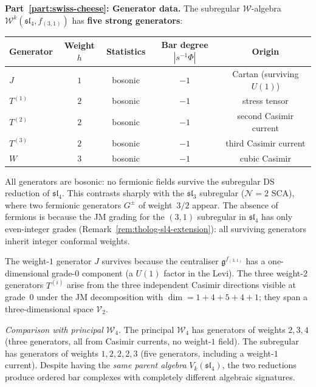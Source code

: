 \begin{computation}
\label{comp:ordered-bar-sl4-subreg}

\medskip
\noindent\textbf{Part~\ref{part:swiss-cheese}: Generator data.}
The subregular $\mathcal W$-algebra
$\mathcal W^k(\mathfrak{sl}_4,f_{(3,1)})$ has \textbf{five
strong generators}:
\begin{center}
\renewcommand{\arraystretch}{1.15}
\begin{tabular}{lcccc}
\textbf{Generator} & \textbf{Weight $h$} &
 \textbf{Statistics} & \textbf{Bar degree $|s^{-1}\Phi|$} &
 \textbf{Origin} \\
\hline
$J$ & $1$ & bosonic & $-1$ &
 Cartan (surviving $U(1)$) \\
$T^{(1)}$ & $2$ & bosonic & $-1$ &
 stress tensor \\
$T^{(2)}$ & $2$ & bosonic & $-1$ &
 second Casimir current \\
$T^{(3)}$ & $2$ & bosonic & $-1$ &
 third Casimir current \\
$W$ & $3$ & bosonic & $-1$ &
 cubic Casimir
\end{tabular}
\end{center}
All generators are bosonic: no fermionic fields survive the
subregular DS reduction of $\mathfrak{sl}_4$. This
contrasts sharply with the $\mathfrak{sl}_3$ subregular
($\mathcal N=2$ SCA), where two fermionic generators
$G^\pm$ of weight~$3/2$ appear. The absence of fermions
is because the JM grading for the $(3,1)$ subregular
in $\mathfrak{sl}_4$ has only even-integer grades
(Remark~\ref{rem:tholog-sl4-extension}): all surviving
generators inherit integer conformal weights.

The weight-$1$ generator $J$ survives because the
centraliser $\mathfrak{g}^{f_{(3,1)}}$ has a one-dimensional
grade-$0$ component (a $U(1)$ factor in the Levi). The
three weight-$2$ generators $T^{(i)}$ arise from the
three independent Casimir directions visible at grade~$0$
under the JM decomposition with
$\dim = 1 + 4 + 5 + 4 + 1$; they span a
three-dimensional space $\mathcal V_2$.

\emph{Comparison with principal $\mathcal W_4$.}
The principal $\mathcal W_4$ has generators of weights
$2, 3, 4$ (three generators, all from Casimir currents,
no weight-$1$ field). The subregular has generators of
weights $1, 2, 2, 2, 3$ (five generators, including a
weight-$1$ current). Despite having the \emph{same
parent algebra} $V_k(\mathfrak{sl}_4)$, the two reductions
produce ordered bar complexes with completely different
algebraic signatures.


\end{computation}
